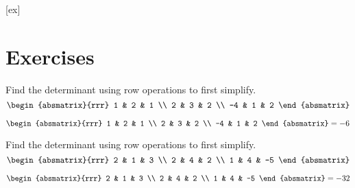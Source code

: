 [ex]
\section*{Exercises}

\begin{enumialphparenastyle}

\begin{ex} Find the determinant using row operations to first simplify. 
\begin{equation*}
\begin{absmatrix}{rrr}
1 & 2 & 1 \\
2 & 3 & 2 \\
-4 & 1 & 2
\end{absmatrix}
\end{equation*}
\begin{sol}
\[
\begin{absmatrix}{rrr}
1 & 2 & 1 \\
2 & 3 & 2 \\
-4 & 1 & 2
\end{absmatrix} = -6
\]
\end{sol}
\end{ex}

\begin{ex} Find the determinant using row operations to first simplify.
\begin{equation*}
\begin{absmatrix}{rrr}
2 & 1 & 3 \\
2 & 4 & 2 \\
1 & 4 & -5
\end{absmatrix}
\end{equation*}
\begin{sol}
\[
\begin{absmatrix}{rrr}
2 & 1 & 3 \\
2 & 4 & 2 \\
1 & 4 & -5
\end{absmatrix} = -32
\]
\end{sol}
\end{ex}


\end{enumialphparenastyle}
